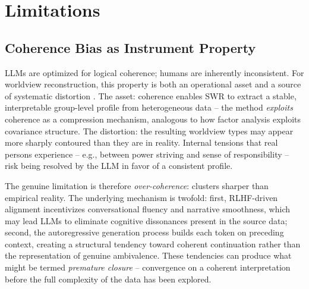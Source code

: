 \documentclass[11pt,a4paper]{article}
\begin{document}
\section{Limitations}
\label{sec:limitations}

\subsection{Coherence Bias as Instrument Property}
\label{sec:limitations:coherence}

LLMs are optimized for logical coherence; humans are inherently inconsistent. For worldview reconstruction, this property is both an operational asset and a source of systematic distortion \citep{Geiger2026PaperA}. The asset: coherence enables SWR to extract a stable, interpretable group-level profile from heterogeneous data -- the method \emph{exploits} coherence as a compression mechanism, analogous to how factor analysis exploits covariance structure. The distortion: the resulting worldview types may appear more sharply contoured than they are in reality. Internal tensions that real persons experience -- e.g., between power striving and sense of responsibility -- risk being resolved by the LLM in favor of a consistent profile.

The genuine limitation is therefore \emph{over-coherence}: clusters sharper than empirical reality. The underlying mechanism is twofold: first, RLHF-driven alignment incentivizes conversational fluency and narrative smoothness, which may lead LLMs to eliminate cognitive dissonances present in the source data; second, the autoregressive generation process builds each token on preceding context, creating a structural tendency toward coherent continuation rather than the representation of genuine ambivalence. These tendencies can produce what might be termed \emph{premature closure} -- convergence on a coherent interpretation before the full complexity of the data has been explored.
\end{document}
